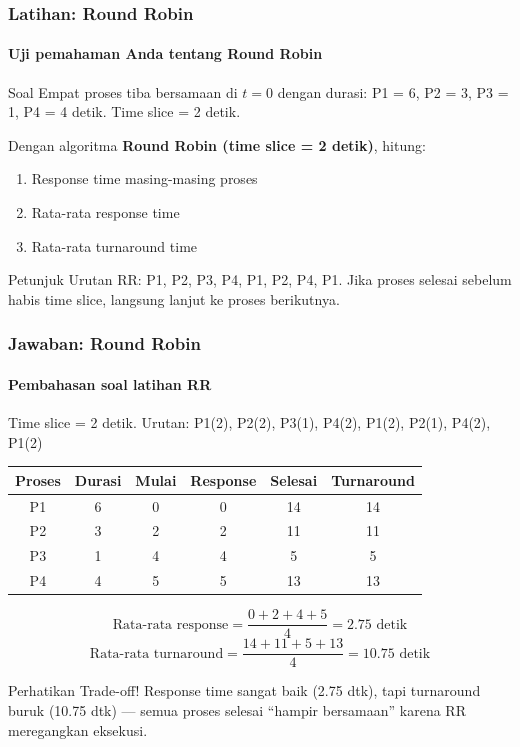 \documentclass[t,aspectratio=169,xcolor=dvipsnames]{beamer}
\begin{document}
\begin{frame}
    \frametitle{Latihan: Round Robin}
    \framesubtitle{Uji pemahaman Anda tentang Round Robin}
    \small
    \begin{block}{Soal}
        Empat proses tiba bersamaan di $t=0$ dengan durasi: P1 = 6, P2 = 3, P3 = 1, P4 = 4 detik. Time slice = 2 detik.

        \vspace{0.1cm}
        Dengan algoritma \textbf{Round Robin (time slice = 2 detik)}, hitung:
        \begin{enumerate}
            \item Response time masing-masing proses
            \item Rata-rata response time
            \item Rata-rata turnaround time
        \end{enumerate}
    \end{block}
    \begin{exampleblock}{Petunjuk}
        Urutan RR: P1, P2, P3, P4, P1, P2, P4, P1. Jika proses selesai sebelum habis time slice, langsung lanjut ke proses berikutnya.
    \end{exampleblock}
\end{frame}

\begin{frame}
    \frametitle{Jawaban: Round Robin}
    \framesubtitle{Pembahasan soal latihan RR}
    \scriptsize
    Time slice = 2 detik. Urutan: P1(2), P2(2), P3(1), P4(2), P1(2), P2(1), P4(2), P1(2)

    \vspace{0.1cm}
    \begin{tabular}{|c|c|c|c|c|c|}
        \hline
        \textbf{Proses} & \textbf{Durasi} & \textbf{Mulai} & \textbf{Response} & \textbf{Selesai} & \textbf{Turnaround} \\
        \hline
        P1 & 6 & 0 & 0 & 14 & 14 \\
        \hline
        P2 & 3 & 2 & 2 & 11 & 11 \\
        \hline
        P3 & 1 & 4 & 4 & 5 & 5 \\
        \hline
        P4 & 4 & 5 & 5 & 13 & 13 \\
        \hline
    \end{tabular}

    \vspace{0.1cm}
    $$\text{Rata-rata response} = \frac{0+2+4+5}{4} = 2.75 \text{ detik}$$
    $$\text{Rata-rata turnaround} = \frac{14+11+5+13}{4} = 10.75 \text{ detik}$$

    \begin{alertblock}{Perhatikan Trade-off!}
        Response time sangat baik (2.75 dtk), tapi turnaround buruk (10.75 dtk) --- semua proses selesai ``hampir bersamaan'' karena RR meregangkan eksekusi.
    \end{alertblock}
\end{frame}
\end{document}
